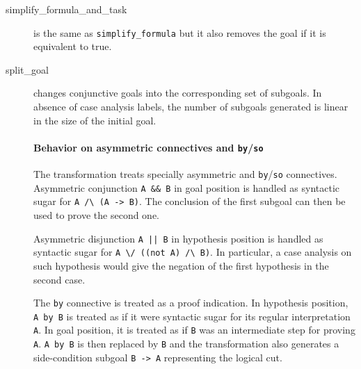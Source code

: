 \begin{description}

\item[simplify\_formula\_and\_task] is the same as \texttt{simplify\_formula}
  but it also removes the goal if it is equivalent to true.

\item[split\_goal] changes conjunctive goals into the
  corresponding set of subgoals. In absence of case analysis labels,
  the number of subgoals generated is linear in the size of the initial goal.

  \paragraph{Behavior on asymmetric connectives and
    \texttt{by}/\texttt{so}}

  The transformation treats specially asymmetric and
  \texttt{by}/\texttt{so} connectives. Asymmetric conjunction
  \verb|A && B| in goal position is handled as syntactic sugar for
  \verb|A /\ (A -> B)|.  The conclusion of the first subgoal can then
  be used to prove the second one.

  Asymmetric disjunction \verb+A || B+ in hypothesis position is handled as
  syntactic sugar for \verb|A \/ ((not A) /\ B)|.
  In particular, a case analysis on such hypothesis would give the negation of
  the first hypothesis in the second case.

  The \texttt{by} connective is treated as a proof indication. In
  hypothesis position, \verb|A by B| is treated as if it were
  syntactic sugar for its regular interpretation \verb|A|. In goal
  position, it is treated as if \verb|B| was an intermediate step for
  proving \verb|A|. \verb|A by B| is then replaced by \verb|B| and the
  transformation also generates a side-condition subgoal \verb|B -> A|
  representing the logical cut.


\end{description}
